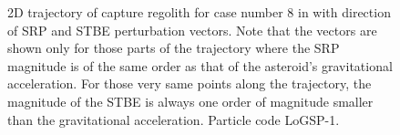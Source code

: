 \begin{figure}[htb]
\centering
\captionsetup{justification=centering}
\caption{2D trajectory of capture regolith for case number 8 in  with direction of \gls{SRP} and \gls{STBE} perturbation vectors. Note that the vectors are shown only for those parts of the trajectory where the \gls{SRP} magnitude is of the same order as that of the asteroid's gravitational acceleration. For those very same points along the trajectory, the magnitude of the \gls{STBE} is always one order of magnitude smaller than the gravitational acceleration. Particle code LoGSP-1.}
\label{fig:LoGSP_1_capture_case_8_2d_trajectory_perturbationVectors}
\end{figure}
